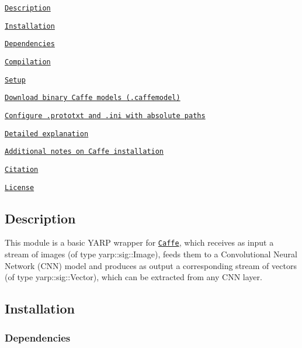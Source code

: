 
\begin{DoxyItemize}
\item \href{#description}{\tt Description}
\item \href{#installation}{\tt Installation}
\begin{DoxyItemize}
\item \href{#dependencies}{\tt Dependencies}
\item \href{#compilation}{\tt Compilation}
\end{DoxyItemize}
\item \href{#setup}{\tt Setup}
\begin{DoxyItemize}
\item \href{#download-binary-caffe-models-caffemodel}{\tt Download binary Caffe models (.caffemodel)}
\item \href{#configure-prototxt-and-ini-with-absolute-paths}{\tt Configure .prototxt and .ini with absolute paths}
\end{DoxyItemize}
\item \href{#detailed-explanation}{\tt Detailed explanation}
\item \href{#additional-notes-on-caffe-installation}{\tt Additional notes on Caffe installation}
\item \href{#citation}{\tt Citation}
\item \href{#license}{\tt License}
\end{DoxyItemize}

\subsection*{Description}

This module is a basic Y\+A\+RP wrapper for \href{http://caffe.berkeleyvision.org/}{\tt Caffe}, which receives as input a stream of images (of type {\ttfamily yarp\+::sig\+::\+Image}), feeds them to a Convolutional Neural Network (C\+NN) model and produces as output a corresponding stream of vectors (of type {\ttfamily yarp\+::sig\+::\+Vector}), which can be extracted from any C\+NN layer.

\subsection*{Installation}

\subsubsection*{Dependencies}


